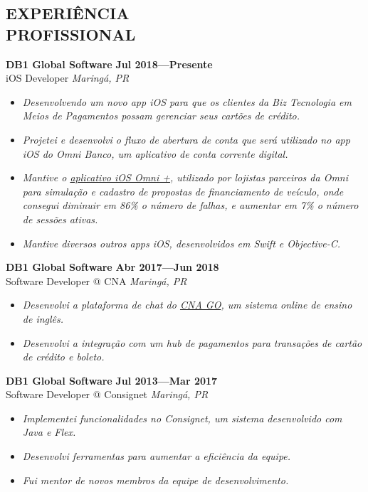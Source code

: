 \documentclass[line,margin]{res}
\begin{document}


\address{\sl \href{https://marcosatanaka.com}{marcosatanaka.com} --- \href{mailto:marcosatanaka@gmail.com}{marcosatanaka@gmail.com}}


\begin{resume}


\section{EXPERIÊNCIA \\ PROFISSIONAL}
  {\bf DB1 Global Software} \hfill {\bf Jul 2018---Presente} \\
  iOS Developer \hfill {\sl Maring\'a, PR}\\[-6pt]
  \begin{itemize}
      \item {\sl Desenvolvendo um novo app iOS para que os clientes da Biz Tecnologia em Meios de Pagamentos possam gerenciar seus cartões de crédito.}
    \item {\sl Projetei e desenvolvi o fluxo de abertura de conta que será utilizado no app iOS do Omni Banco, um aplicativo de conta corrente digital.}
    \item {\sl Mantive o \href{https://apps.apple.com/br/app/omni/id1276332750}{aplicativo iOS Omni +}, utilizado por lojistas parceiros da Omni para simulação e cadastro de propostas de financiamento de veículo, onde consegui diminuir em 86\% o número de falhas, e aumentar em 7\% o número de sessões ativas.}
    \item {\sl Mantive diversos outros apps iOS, desenvolvidos em Swift e Objective-C.}
  \end{itemize}

  {\bf DB1 Global Software} \hfill {\bf Abr 2017---Jun 2018} \\
  Software Developer @ CNA \hfill {\sl Maring\'a, PR}\\[-6pt]
  \begin{itemize}
    \item {\sl Desenvolvi a plataforma de chat do \href{https://www.cnago.com.br}{CNA GO}, um sistema online de ensino de inglês.}
    \item {\sl Desenvolvi a integração com um hub de pagamentos para transações de cartão de crédito e boleto.}
  \end{itemize}

  {\bf DB1 Global Software} \hfill {\bf Jul 2013---Mar 2017} \\
  Software Developer @ Consignet \hfill {\sl Maring\'a, PR}\\[-6pt]
  \begin{itemize}
    \item {\sl Implementei funcionalidades no Consignet, um sistema desenvolvido com Java e Flex.}
    \item {\sl Desenvolvi ferramentas para aumentar a eficiência da equipe.}
    \item {\sl Fui mentor de novos membros da equipe de desenvolvimento.}
  \end{itemize}


\end{resume}
\end{document}
